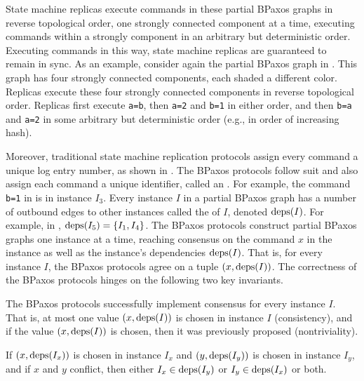 State machine replicas execute commands in these partial BPaxos graphs in
reverse topological order, one strongly connected component at a time, executing
commands within a strongly component in an arbitrary but deterministic order.
Executing commands in this way, state machine replicas are guaranteed to remain
in sync. As an example, consider again the partial BPaxos graph in
. This graph has four strongly connected components, each
shaded a different color. Replicas execute these four strongly connected
components in reverse topological order. Replicas first execute \texttt{a=b},
then \texttt{a=2} and \texttt{b=1} in either order, and then \texttt{b=a} and
\texttt{a=2} in some arbitrary but deterministic order (e.g., in order of
increasing hash).

Moreover, traditional state machine replication protocols assign every command
a unique log entry number, as shown in . The BPaxos protocols
follow suit and also assign each command a unique identifier, called an
. For example, the command \texttt{b=1} in 
is in instance $I_3$. Every instance $I$ in a partial BPaxos graph has a number
of outbound edges to other instances called the  of $I$,
denoted $\text{deps}(I)$. For example, in , $\text{deps}(I_5) = \{I_1,
I_4\}$.
%
The BPaxos protocols construct partial BPaxos graphs one instance at a time,
reaching consensus on the command $x$ in the instance as well as the instance's
dependencies $\text{deps}(I)$. That is, for every instance $I$, the BPaxos protocols
agree on a tuple $(x, \text{deps}(I))$.
%
The correctness of the BPaxos protocols hinges on the following two key
invariants.

\begin{invariant}
  The BPaxos protocols successfully implement consensus for every instance $I$.
  That is, at most one value $(x, \text{deps}(I))$ is chosen in instance $I$
  (consistency), and if the value $(x, \text{deps}(I))$ is chosen, then it was
  previously proposed (nontriviality).
\end{invariant}%
%
\begin{invariant}
  If $(x, \text{deps}(I_x))$ is chosen in instance $I_x$ and $(y, \text{deps}(I_y))$ is
  chosen in instance $I_y$, and if $x$ and $y$ conflict, then either $I_x \in
  \text{deps}(I_y)$ or $I_y \in \text{deps}(I_x)$ or both.
\end{invariant}

